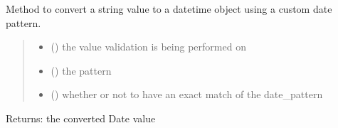\documentclass[letterpaper,10pt,english]{sphinxmanual}
\begin{document}
\begin{fulllineitems}
\begin{fulllineitems}
\label{\detokenize{apache_commons_validator_python:apache_commons_validator_python.generic_type_validator_new.GenericTypeValidator.format_date_pattern}}
\pysigstartsignatures
{}
\pysigstopsignatures
\sphinxAtStartPar
Method to convert a string value to a datetime object using a custom date
pattern.
\begin{quote}\begin{description}
\begin{itemize}
\item {} 
\sphinxAtStartPar
{} () \textendash{} the value validation is being performed on

\item {} 
\sphinxAtStartPar
{} () \textendash{} the pattern

\item {} 
\sphinxAtStartPar
{} () \textendash{} whether or not to have an exact match of the date\_pattern

\end{itemize}

\end{description}\end{quote}

\sphinxAtStartPar
Returns: the converted Date value

\end{fulllineitems}



\end{fulllineitems}
\end{document}
